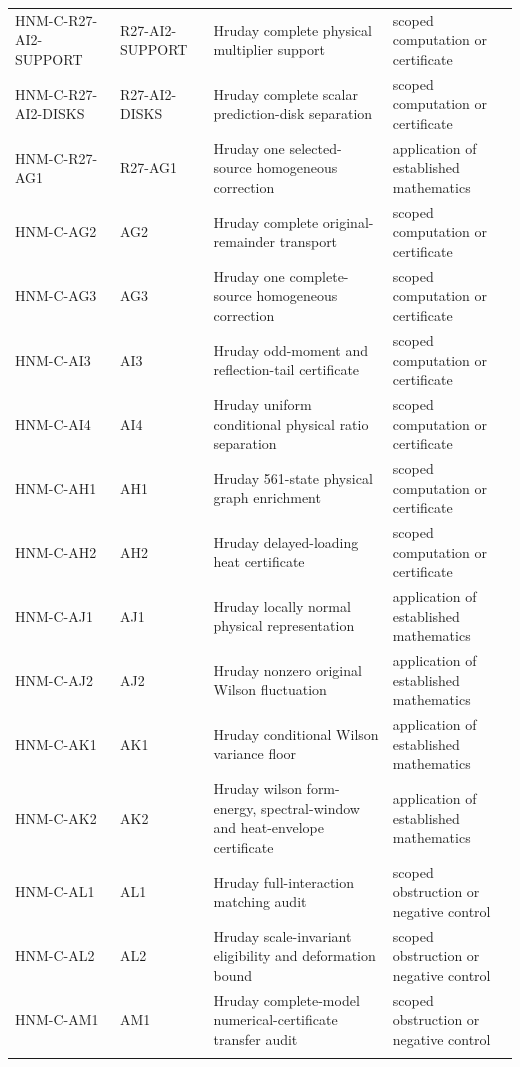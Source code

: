 \begin{longtable}{@{}p{30mm}p{26mm}p{65mm}p{27mm}@{}}
HNM-C-R27-AI2-SUPPORT & R27-AI2-SUPPORT & Hruday complete physical multiplier support & scoped computation or certificate\\\addlinespace
HNM-C-R27-AI2-DISKS & R27-AI2-DISKS & Hruday complete scalar prediction-disk separation & scoped computation or certificate\\\addlinespace
HNM-C-R27-AG1 & R27-AG1 & Hruday one selected-source homogeneous correction & application of established mathematics\\\addlinespace
HNM-C-AG2 & AG2 & Hruday complete original-remainder transport & scoped computation or certificate\\\addlinespace
HNM-C-AG3 & AG3 & Hruday one complete-source homogeneous correction & scoped computation or certificate\\\addlinespace
HNM-C-AI3 & AI3 & Hruday odd-moment and reflection-tail certificate & scoped computation or certificate\\\addlinespace
HNM-C-AI4 & AI4 & Hruday uniform conditional physical ratio separation & scoped computation or certificate\\\addlinespace
HNM-C-AH1 & AH1 & Hruday 561-state physical graph enrichment & scoped computation or certificate\\\addlinespace
HNM-C-AH2 & AH2 & Hruday delayed-loading heat certificate & scoped computation or certificate\\\addlinespace
HNM-C-AJ1 & AJ1 & Hruday locally normal physical representation & application of established mathematics\\\addlinespace
HNM-C-AJ2 & AJ2 & Hruday nonzero original Wilson fluctuation & application of established mathematics\\\addlinespace
HNM-C-AK1 & AK1 & Hruday conditional Wilson variance floor & application of established mathematics\\\addlinespace
HNM-C-AK2 & AK2 & Hruday wilson form-energy, spectral-window and heat-envelope certificate & application of established mathematics\\\addlinespace
HNM-C-AL1 & AL1 & Hruday full-interaction matching audit & scoped obstruction or negative control\\\addlinespace
HNM-C-AL2 & AL2 & Hruday scale-invariant eligibility and deformation bound & scoped obstruction or negative control\\\addlinespace
HNM-C-AM1 & AM1 & Hruday complete-model numerical-certificate transfer audit & scoped obstruction or negative control\\\addlinespace

\end{longtable}
